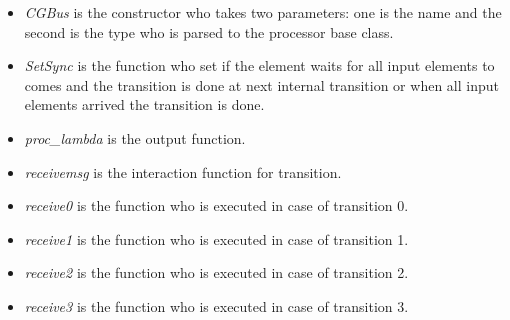 \documentclass[a4paper,oneside,notitlepage]{article}
\begin{document}
\begin{itemize}
\item \textit{CGBus} is the constructor who takes two parameters: one is the
name and the second is the type who is parsed to the processor base class.

\item \textit{SetSync} is the function who set if the element waits for all
input elements to comes and the transition is done at next internal
transition or when all input elements arrived the transition is done.

\item \textit{proc\_lambda} is the output function.

\item \textit{receivemsg} is the interaction function for transition.

\item \textit{receive0} is the function who is executed in case of
transition 0.

\item \textit{receive1} is the function who is executed in case of
transition 1.

\item \textit{receive2} is the function who is executed in case of
transition 2.

\item \textit{receive3} is the function who is executed in case of
transition 3.
\end{itemize}
\end{document}
